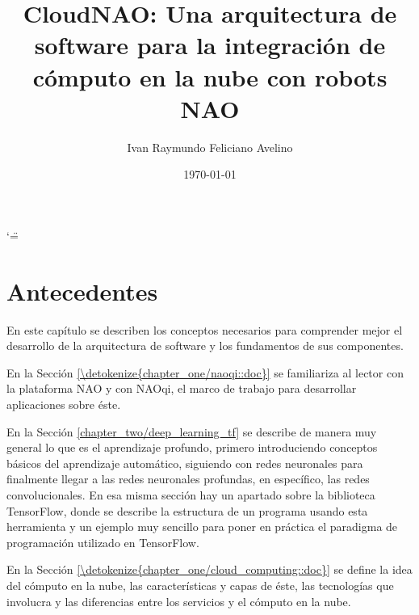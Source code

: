 \documentclass[letterpaper,12pt,spanish]{report}
\title{CloudNAO: Una arquitectura de software para la integración de
cómputo en la nube con robots NAO}
\date{\today}
\author{Ivan Raymundo Feliciano Avelino}
\begin{document}
\ifnum\catcode`\"=\active{}\fi
\maketitle
\sphinxtableofcontents








\chapter{Antecedentes}
\label{\detokenize{chapter_one:antecedentes}}\label{\detokenize{chapter_one::doc}}

En este capítulo se describen los conceptos 
necesarios para comprender mejor el desarrollo
de la arquitectura de software y los fundamentos
de sus componentes. 

En la Sección \ref{\detokenize{chapter_one/naoqi::doc}} se 
familiariza al lector con la plataforma NAO y con
NAOqi, el marco de trabajo para desarrollar
aplicaciones sobre éste. 

En la Sección \ref{chapter_two/deep_learning_tf} se describe 
de manera muy general lo que es el aprendizaje profundo,
primero introduciendo conceptos básicos del aprendizaje 
automático, siguiendo con redes neuronales para finalmente
llegar a las redes neuronales profundas, en específico,
las redes convolucionales. En esa misma sección
hay un apartado sobre la biblioteca TensorFlow,
donde se describe la estructura de un programa
usando esta herramienta y un ejemplo muy
sencillo para poner en práctica el paradigma de programación utilizado
en TensorFlow.

En la Sección \ref{\detokenize{chapter_one/cloud_computing::doc}}
se define la idea del cómputo en la nube, las características y capas de éste, 
las tecnologías que involucra y las diferencias entre los servicios y el cómputo en la nube.
\end{document}
